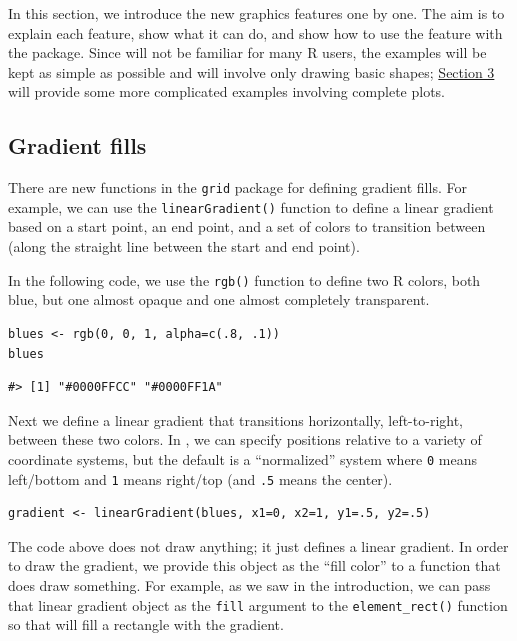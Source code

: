 In this section, we introduce the new graphics features one by one.
The aim is to explain each feature, show what it can do, and show
how to use the feature with the  package.
Since  will not be familiar for many R users,
the examples will be kept as simple as possible and will involve only drawing
basic shapes; \protect\hyperlink{integration}{Section 3} will provide some more
complicated examples involving complete plots.

\hypertarget{gradient-fills}{%
\subsection{Gradient fills}\label{gradient-fills}}

There are new functions in the \texttt{grid} package for
defining gradient fills. For example,
we can use the \texttt{linearGradient()} function to
define a linear gradient based on a start point, an end point,
and a set of colors to transition between (along the straight
line between the start and end point).

In the following code, we use the \texttt{rgb()} function to
define two R colors, both blue, but one
almost opaque and one almost completely transparent.

\begin{verbatim}
blues <- rgb(0, 0, 1, alpha=c(.8, .1))
blues
\end{verbatim}

\begin{verbatim}
#> [1] "#0000FFCC" "#0000FF1A"
\end{verbatim}

Next we define a linear gradient that
transitions horizontally, left-to-right, between these two colors.
In , we can specify positions relative to a variety of
coordinate systems, but the default is a ``normalized'' system
where \texttt{0} means left/bottom and \texttt{1} means right/top (and \texttt{.5}
means the center).

\begin{verbatim}
gradient <- linearGradient(blues, x1=0, x2=1, y1=.5, y2=.5)
\end{verbatim}

The code above does not draw anything; it just defines a linear gradient.
In order to draw the gradient, we provide this object as the ``fill color''
to a function that does draw something.
For example,
as we saw in the introduction, we can pass that linear
gradient object as the \texttt{fill} argument to the \texttt{element\_rect()} function so that
 will fill a rectangle with the gradient.

